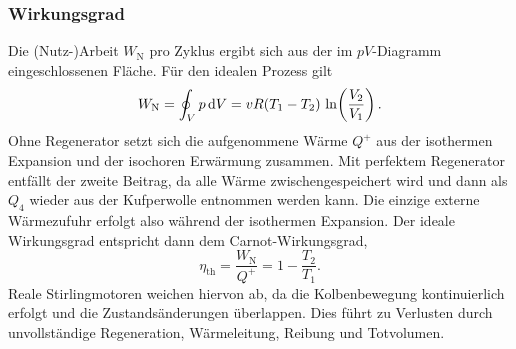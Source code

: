 \subsubsection{Wirkungsgrad}
Die (Nutz-)Arbeit \(W_\text{N}\) pro Zyklus ergibt sich aus der im \(pV\)-Diagramm eingeschlossenen Fläche. Für den idealen Prozess gilt
\begin{equation}
    \label{WN}
    W_\mathrm{N} = \oint_V p\mathop{}\!\mathrm{d} V= v R (T_1 - T_2)\, \ln\!\left(\frac{V_2}{V_1}\right).
\end{equation}
Ohne Regenerator setzt sich die aufgenommene Wärme \(Q^+\) aus der isothermen Expansion und der isochoren Erwärmung zusammen. Mit perfektem Regenerator entfällt der zweite Beitrag, da alle Wärme zwischengespeichert wird und dann als \(Q_4\) wieder aus der Kufperwolle entnommen werden kann. Die einzige externe Wärmezufuhr erfolgt also während der isothermen Expansion. Der ideale Wirkungsgrad entspricht dann dem Carnot-Wirkungsgrad,
\begin{equation}
    \label{Carnot}
    \eta_\mathrm{th} =\frac{W_\text{N}}{Q^+}= 1 - \frac{T_2}{T_1}.
\end{equation}
Reale Stirlingmotoren weichen hiervon ab, da die Kolbenbewegung kontinuierlich erfolgt und die Zustandsänderungen überlappen. Dies führt zu Verlusten durch unvollständige Regeneration, Wärmeleitung, Reibung und Totvolumen.
